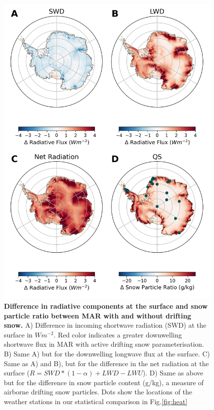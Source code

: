 \documentclass[draft]{agujournal2019}
\begin{document}
\begin{figure}[H]
	\includegraphics[scale=0.65]{SEB_with_stations.png}
	\caption{\textbf{Difference in radiative components at the surface and snow particle ratio between MAR with and without drifting snow.} A) Difference in incoming shortwave radiation (SWD) at the surface in $Wm^{-2}$. Red color indicates a greater downwelling shortwave flux in MAR with active drifting snow parameterisation. B) Same A) but for the downwelling longwave flux at the surface. C) Same as A) and B), but for the difference in the net radiation at the surface ($R= SWD * (1 - \alpha) + LWD - LWU$). D) Same as above but for the difference in snow particle content (g/kg), a measure of airborne drifting snow particles. Dots show the locations of the weather stations in our statistical comparison in Fig.\ref{fig:heat}}
	\label{fig:SEB}
\end{figure}
\end{document}

